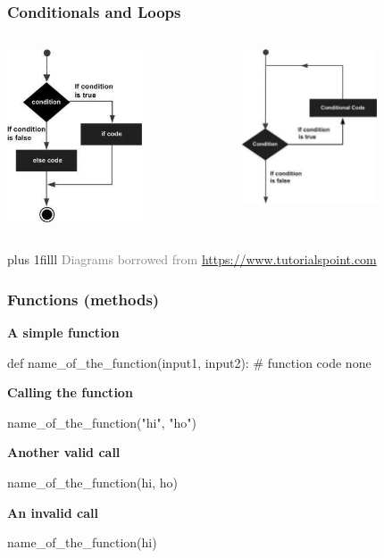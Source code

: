 \documentclass[xcolor=x11names,handout]{beamer}
\newcommand{\light}[1]{\textcolor{gray}{#1}}
\newcommand{\btVFill}{\vskip0pt plus 1filll}
\begin{document}
\begin{frame}
\frametitle{Conditionals and Loops}
\vspace{5mm}

\begin{columns}
\begin{column}{0.4\textwidth}
 \begin{center}
 \includegraphics[width=4cm]{img/if_else_statement.jpg}
\end{center}
\end{column}					\pause 
\begin{column}{0.4\textwidth}
 \begin{center}
 \includegraphics[width=4cm]{img/loop_architecture.jpg}
\end{center}
\end{column}
\end{columns}

\btVFill
\onslide
\footnotesize
\light{Diagrams borrowed from \url{https://www.tutorialspoint.com}}
\end{frame}

\begin{frame}[fragile]
\frametitle{Functions (methods)}

\textbf{A simple function}
\begin{python}
  def name_of_the_function(input1, input2):
      # function code
      none
\end{python}
\pause

\textbf{Calling the function}
\begin{python}
name_of_the_function("hi", "ho")
\end{python}
\pause

\textbf{Another valid call}
\begin{python}
name_of_the_function(hi, ho)
\end{python}
\pause

\textbf{An invalid call}
\begin{python}
name_of_the_function(hi)
\end{python}
\end{frame}
\end{document}
